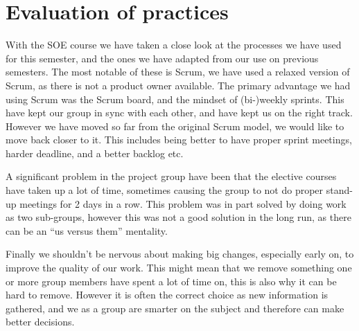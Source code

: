 \chapter{Evaluation of practices}
With the SOE course we have taken a close look at the processes we have used for this semester, and the ones we have adapted from our use on previous semesters.
The most notable of these is Scrum, we have used a relaxed version of Scrum, as there is not a product owner available. 
The primary advantage we had using Scrum was the Scrum board, and the mindset of (bi-)weekly sprints.
This have kept our group in sync with each other, and have kept us on the right track. 
However we have moved so far from the original Scrum model, we would like to move back closer to it.
This includes being better to have proper sprint meetings, harder deadline, and a better backlog etc. 

A significant problem in the project group have been that the elective courses have taken up a lot of time, sometimes causing the group to not do proper stand-up meetings for 2 days in a row. 
This problem was in part solved by doing work as two sub-groups, however this was not a good solution in the long run, as there can be an ``us versus them'' mentality. 

Finally we shouldn't be nervous about making big changes, especially early on, to improve the quality of our work. 
This might mean that we remove something one or more group members have spent a lot of time on, this is also why it can be hard to remove. 
However it is often the correct choice as new information is gathered, and we as a group are smarter on the subject and therefore can make better decisions.
